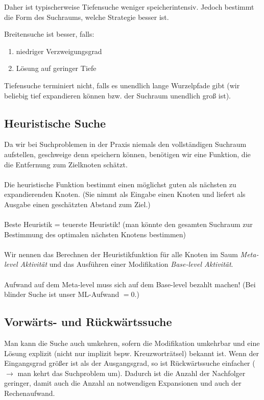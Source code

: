 \documentclass[runningheads,deutsch]{llncs}
\begin{document}
Daher ist typischerweise Tiefensuche weniger speicherintensiv. Jedoch bestimmt die Form des Suchraums, welche Strategie besser ist.

Breitensuche ist besser, falls:
\begin{enumerate}
    \item niedriger Verzweigungsgrad
    \item Lösung auf geringer Tiefe
\end{enumerate}

Tiefensuche terminiert nicht, falls es unendlich lange Wurzelpfade gibt (wir beliebig tief expandieren können bzw. der Suchraum unendlich groß ist).

\subsection{Heuristische Suche}

Da wir bei Suchproblemen in der Praxis niemals den vollständigen Suchraum aufstellen, geschweige denn speichern können, benötigen wir eine Funktion, die die Entfernung zum Zielknoten schätzt.
\\
\\
Die heuristische Funktion bestimmt einen möglichst guten als nächsten zu expandierenden Knoten. (Sie nimmt als Eingabe einen Knoten und liefert als Ausgabe einen geschätzten Abstand zum Ziel.)
\\
\\
Beste Heuristik = teuerste Heuristik! (man könnte den gesamten Suchraum zur Bestimmung des optimalen nächsten Knotens bestimmen)
\\
\\
Wir nennen das Berechnen der Heuristikfunktion für alle Knoten im Saum \textit{Meta-level Aktivität} und das Ausführen einer Modifikation \textit{Base-level Aktivität}.
\\
\\
Aufwand auf dem Meta-level muss sich auf dem Base-level bezahlt machen! (Bei blinder Suche ist unser ML-Aufwand $ = 0$.)

\subsection{Vorwärts- und Rückwärtssuche}

Man kann die Suche auch umkehren, sofern die Modifikation umkehrbar und eine Lösung explizit (nicht nur implizit bspw. Kreuzworträtsel) bekannt ist. Wenn der Eingangsgrad größer ist als der Ausgangsgrad, so ist Rückwärtssuche einfacher ($\rightarrow$ man kehrt das Suchproblem um). Dadurch ist die Anzahl der Nachfolger geringer, damit auch die Anzahl an notwendigen Expansionen und auch der Rechenaufwand.
\end{document}
